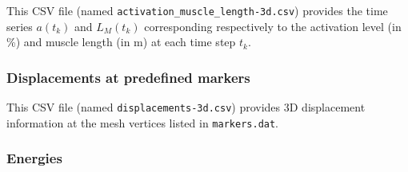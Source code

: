\documentclass{sfuthesis}
\numberwithin{equation}{section}
\numberwithin{figure}{chapter}
\numberwithin{table}{chapter}
\theoremstyle{definition}
\begin{document}
This CSV file (named \texttt{activation\_muscle\_length-3d.csv}) provides the time series $a(t_k)$ and $L_M(t_k)$ corresponding respectively to the activation level (in \%) and muscle length (in m) at each time step $t_k$.

\subsubsection{Displacements at predefined markers}

This CSV file (named \texttt{displacements-3d.csv}) provides 3D displacement information at the mesh vertices listed in \texttt{markers.dat}.

\subsubsection{Energies}
\end{document}
